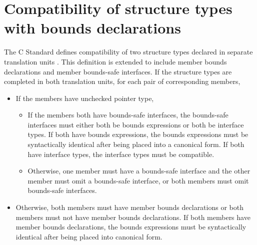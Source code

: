 \section{Compatibility of structure types with bounds declarations}

The C Standard defines compatibility of two structure types declared in
separate translation units \cite[Section 6.2.7]{ISO2011}.  This definition
is extended to include member bounds declarations and member bounds-safe
interfaces.  If the structure types are completed in both translation
units, for each pair of corresponding members,
\begin{itemize}
\item If the members have unchecked pointer type,
\begin{itemize}
\item If the members both have bounds-safe interfaces, the bounds-safe
interfaces must either both be bounds expressions or both be interface
types. If both have bounds expressions, the bounds expressions must be
syntactically identical after being placed into a canonical form.
If both have interface types, the interface types must be compatible.
\item Otherwise,  one member must have a bounds-safe interface and the
other member must omit a bounds-safe interface, or both members must omit
bounds-safe interfaces.
\end{itemize}
\item Otherwise, both members must have member bounds declarations or both
members must not have member bounds declarations.  If both members have
member bounds declarations, the bounds expressions must be syntactically
identical after being placed into canonical form.
\end{itemize}
